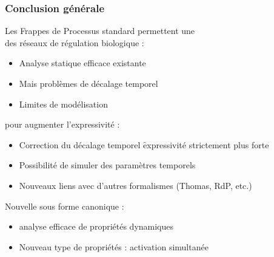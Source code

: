 
\begin{frame}[c]
  \frametitle{Conclusion générale}

Les Frappes de Processus standard permettent une \\
des réseaux de régulation biologique :
\begin{itemize}
  \item Analyse statique efficace existante
  \item Mais problèmes de décalage temporel
  \item Limites de modélisation
\end{itemize}

\medskip
{} pour augmenter l'expressivité :
\begin{itemize}
  \item Correction du décalage temporel \f expressivité strictement plus forte
  \item Possibilité de simuler des paramètres temporels
  \item Nouveaux liens avec d'autres formalismes (Thomas, RdP, etc.)
\end{itemize}

\medskip
Nouvelle  sous forme canonique :
\begin{itemize}
  \item analyse efficace de propriétés dynamiques
  \item Nouveau type de propriétés : activation simultanée
\end{itemize}


\end{frame}
